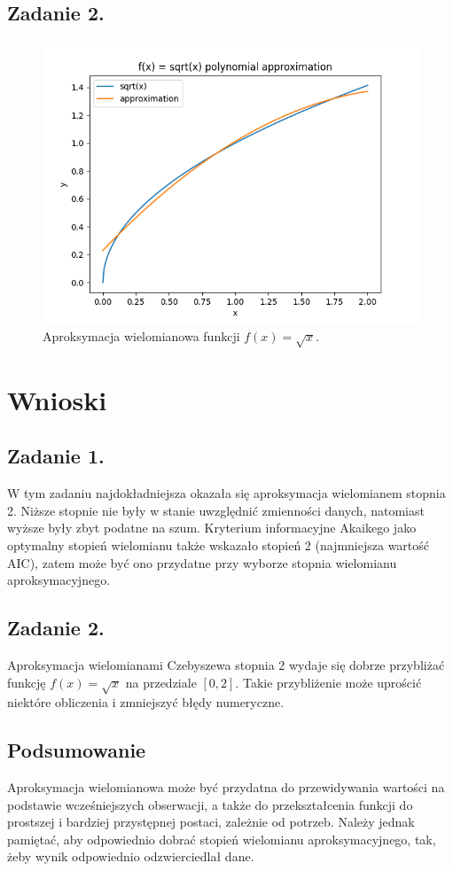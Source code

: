 \documentclass[11pt]{scrartcl}
\begin{document}
    \subsection{Zadanie 2.}
    \begin{figure}[H]
        \centering
        \includegraphics[width=0.8\linewidth]{approx2.png}
        \caption{Aproksymacja wielomianowa funkcji $f(x)=\sqrt{x}$.}
    \end{figure}

    \section{Wnioski}
    \subsection*{Zadanie 1.}
    W tym zadaniu najdokładniejsza okazała się aproksymacja wielomianem
    stopnia 2. Niższe stopnie nie były w stanie uwzględnić zmienności
    danych, natomiast wyższe były zbyt podatne na szum. Kryterium
    informacyjne Akaikego jako optymalny stopień wielomianu
    także wskazało stopień 2 (najmniejsza wartość AIC), zatem może być ono
    przydatne przy wyborze stopnia wielomianu aproksymacyjnego.

    \subsection*{Zadanie 2.}
    Aproksymacja wielomianami Czebyszewa stopnia 2 wydaje się dobrze
    przybliżać funkcję $f(x)=\sqrt{x}$ na przedziale $[0,2]$. Takie
    przybliżenie może uprościć niektóre obliczenia i zmniejszyć błędy
    numeryczne.

    \subsection*{Podsumowanie}
    Aproksymacja wielomianowa może być przydatna do przewidywania wartości
    na podstawie wcześniejszych obserwacji, a także do przekształcenia
    funkcji do prostszej i bardziej przystępnej postaci, zależnie od
    potrzeb. Należy jednak pamiętać, aby odpowiednio dobrać stopień
    wielomianu aproksymacyjnego, tak, żeby wynik odpowiednio odzwierciedlał
    dane.
\end{document}
